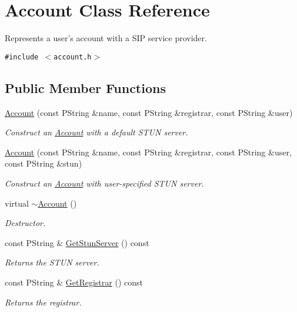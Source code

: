 \hypertarget{classAccount}{
\section{Account Class Reference}
\label{classAccount}
}
Represents a user's account with a SIP service provider.  


{\tt \#include $<$account.h$>$}

\subsection*{Public Member Functions}
\begin{CompactItemize}
\item 
\hyperlink{classAccount_8f195affd9f203c7bec7970c4702768f}{Account} (const PString \&name, const PString \&registrar, const PString \&user)
\begin{CompactList}\small\item\em Construct an \hyperlink{classAccount}{Account} with a default STUN server. \item\end{CompactList}\item 
\hyperlink{classAccount_8325decb7b215b2860e3a4d7eaa72402}{Account} (const PString \&name, const PString \&registrar, const PString \&user, const PString \&stun)
\begin{CompactList}\small\item\em Construct an \hyperlink{classAccount}{Account} with user-specified STUN server. \item\end{CompactList}\item 
virtual \hyperlink{classAccount_569c9ef0e42b9157690b4ceb646daba8}{$\sim$Account} ()
\begin{CompactList}\small\item\em Destructor. \item\end{CompactList}\item 
const PString \& \hyperlink{classAccount_8e3cc9ed5f4f8bc36b68f352dd34af2c}{GetStunServer} () const 
\begin{CompactList}\small\item\em Returns the STUN server. \item\end{CompactList}\item 
const PString \& \hyperlink{classAccount_147ffe4f7db1e9f987af6a24927f638e}{GetRegistrar} () const 
\begin{CompactList}\small\item\em Returns the registrar. \item\end{CompactList}\item 

\end{CompactItemize}
